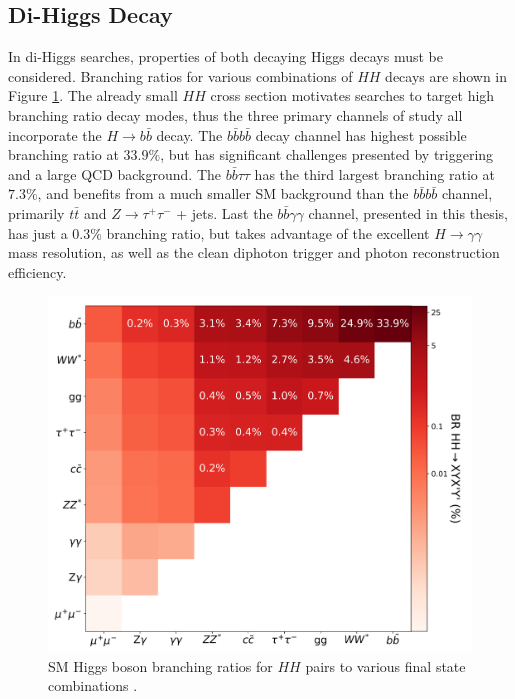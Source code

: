 \subsection{Di-Higgs Decay} \label{ssec:dihiggs-decay}

In di-Higgs searches, properties of both decaying Higgs decays must be considered. Branching ratios for various combinations of $HH$ decays are shown in Figure \ref{fig:hh-brs}. The already small $HH$ cross section motivates searches to target high branching ratio decay modes, thus the three primary channels of study all incorporate the $H\rightarrow b\bar{b}$ decay. The $b\bar{b}b\bar{b}$ decay channel has highest possible branching ratio at $33.9\%$, but has significant challenges presented by triggering and a large QCD background. The $b\bar{b}\tau \tau$ has the third largest branching ratio at $7.3\%$, and benefits from a much smaller \gls{SM} background than the $b\bar{b}b\bar{b}$ channel, primarily $t\bar{t}$ and $Z\rightarrow \tau^+ \tau^-$ + jets. Last the $b\bar{b} \gamma \gamma$ channel, presented in this thesis, has just a $0.3\%$ branching ratio, but takes advantage of the excellent $H\rightarrow \gamma\gamma$ mass resolution, as well as the clean diphoton trigger and photon reconstruction efficiency.

\begin{figure}[!htp]
    \centering
    \includegraphics[width=.75\textwidth]{chapters/chapter1_theory/images/hh-brs.png}
    \caption[\gls{SM} Higgs boson branching ratios for $HH$ pairs to various final state combinations]{\gls{SM} Higgs boson branching ratios for $HH$ pairs to various final state combinations \cite{hh-whitepaper}.}
    \label{fig:hh-brs}
\end{figure}